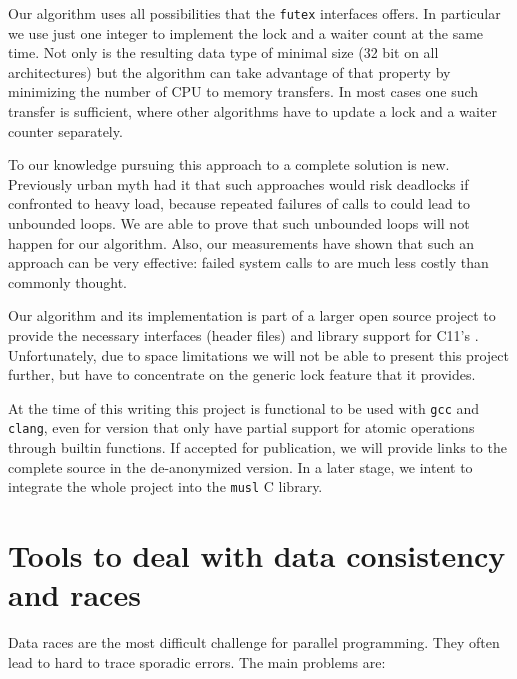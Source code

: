 Our algorithm uses all possibilities that the \texttt{futex} interfaces
offers. In particular we use just one  integer to
implement the lock and a waiter count at the same time. Not only is
the resulting data type of minimal size (32 bit on all
architectures) but the algorithm can take advantage of that property
by minimizing the number of CPU to memory transfers. In most cases
one such transfer is sufficient, where other algorithms have to
update a lock and a waiter counter separately.

To our knowledge pursuing this approach to a complete solution is
new. Previously urban myth had it that such approaches would risk
deadlocks if confronted to heavy load, because repeated failures of
calls to  could lead to unbounded loops. We are able to
prove that such unbounded loops will not happen for our algorithm.
Also, our measurements have shown that such an approach can be very
effective: failed system calls to  are much less costly
than commonly thought.

Our algorithm and its implementation is part of a larger open
source project to provide the necessary interfaces (header files)
and library support for C11's . Unfortunately, due to
space limitations we will not be able to present this project
further, but have to concentrate on the generic lock feature that it
provides.

At the time of this writing this project is functional to be used
with \texttt{gcc} and \texttt{clang}, even for version that only have partial
support for atomic operations through builtin functions. If accepted
for publication, we will provide links to the complete source in the
de-anonymized version. In a later stage, we intent to integrate the
whole project into the \texttt{musl} C library.

\section{Tools to deal with data consistency and races}
\label{sec-2}

Data races are the most difficult challenge for parallel
programming. They often lead to hard to trace sporadic errors.
\iflong
The main problems are:\itemadjust


